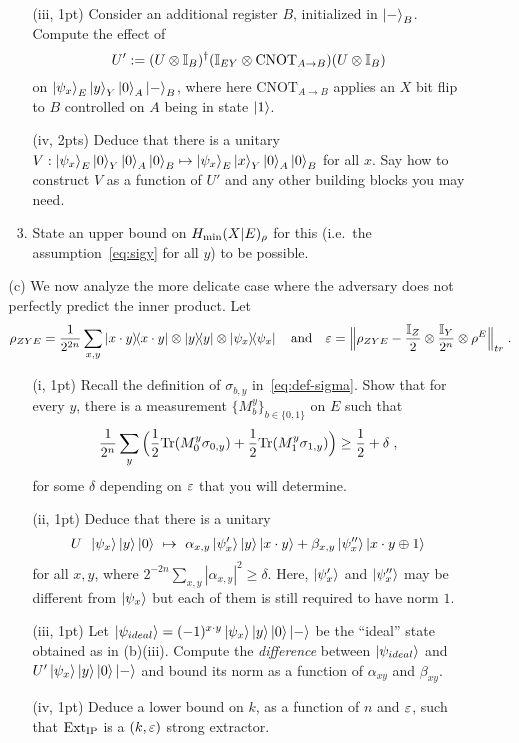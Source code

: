 \documentclass[12pt]{article}
\begin{document}
\begin{enumerate}
\begin{enumerate}
\begin{enumerate}
\item[(iii, 1pt)] Consider an additional register $B$, initialized in $\ket{-}_B$. Compute the effect of  
\[  U':=(U\otimes \mathbb{I}_B)^\dagger (\mathbb{I}_{EY}\otimes \mathrm{CNOT}_{A\to B})(U\otimes \mathbb{I}_{B})\]
 on $\ket{\psi_x}_E\ket{y}_Y\ket{0}_A\ket{-}_B$, where here  $\mathrm{CNOT}_{A\to B}$ applies an $X$ bit flip to $B$ controlled on $A$ being in state $\ket{1}$.
\item[(iv, 2pts)] Deduce that there is a unitary $V: \ket{\psi_x}_E\ket{0}_Y\ket{0}_A\ket{0}_B\mapsto \ket{\psi_x}_E\ket{x}_Y\ket{0}_A\ket{0}_B$ for all $x$. Say how to construct $V$ as a function of $U'$ and any other building blocks you may need. 
\item State an upper bound on $H_{\rm min}(X|E)_\rho$ for this (i.e.\ the assumption~\eqref{eq:sigy} for all $y$) to be possible. 
\end{enumerate}
\item[(c)] We now analyze the more delicate case where the adversary does not perfectly predict the inner product. Let 
\[ \rho_{ZYE}=\frac{1}{2^{2n}}\sum_{x,y} \ket{x\cdot y}\!\!\bra{x\cdot y}\otimes \ket{y}\!\!\bra{y}\otimes\ket{\psi_x}\!\!\bra{\psi_x}\quad\text{and}\quad\varepsilon = \Big\|\rho_{ZYE} - \frac{\mathbb{I}_Z}{2} \otimes \frac{\mathbb{I}_Y}{2^n}  \otimes \rho^E\Big\|_{tr}\;.\]
 \begin{enumerate}
\item[(i, 1pt)] Recall the definition of $\sigma_{b,y}$ in~\eqref{eq:def-sigma}. 
 Show that for every $y$, there is a measurement $\{M^y_b\}_{b\in\{0,1\}}$ on $E$ such that 
\[\frac{1}{2^n}\sum_y \Big(  \frac{1}{2}\mathrm{Tr}(M^y_{0} \sigma_{0,y})+\frac{1}{2}\mathrm{Tr}(M^y_{1} \sigma_{1,y})\Big) \geq \frac{1}{2}+\delta\;,\]
 for some $\delta$ depending on $\varepsilon$ that you will determine. 
\item[(ii, 1pt)] Deduce that there is a unitary 
\[ U\:\; \ket{\psi_x}\ket{y}\ket{0} \ \mapsto\ \alpha_{x,y}\ket{\psi'_x}\ket{y}\ket{x\cdot y}+\beta_{x,y}\ket{\psi''_x}\ket{x\cdot y\oplus 1}\]
 for all $x,y$, where $2^{-2n}\sum_{x,y} |\alpha_{x,y}|^2 \geq \delta$. Here, $\ket{\psi'_x}$ and $\ket{\psi''_x}$ may be different from $\ket{\psi_x}$ but each of them is still required to have norm $1$.
\item[(iii, 1pt)] Let $\ket{\psi_{ideal}} = (-1)^{x\cdot y}\ket{\psi_x}\ket{y}\ket{0}\ket{-}$ be the ``ideal'' state obtained as in (b)(iii). Compute the \emph{difference} between $\ket{\psi_{ideal}}$ and $U'\ket{\psi_x}\ket{y}\ket{0}\ket{-}$ and bound its norm as a function of $\alpha_{xy}$ and $\beta_{xy}$.
\item[(iv, 1pt)] Deduce a lower bound on $k$, as a function of $n$ and $\varepsilon$, such that $\mathrm{Ext}_{\mathrm{IP}}$ is a $(k,\varepsilon)$ strong extractor.  
\end{enumerate}
\end{enumerate}

\end{enumerate}
\end{document}
